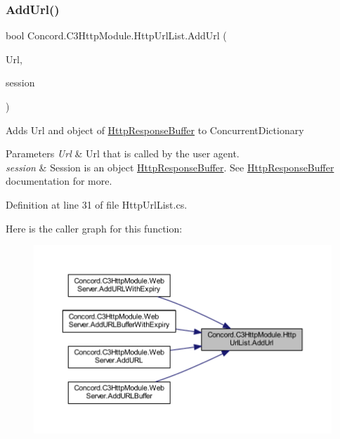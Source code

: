 \subsubsection{\texorpdfstring{AddUrl()}{AddUrl()}}
{\footnotesize\ttfamily bool Concord.\+C3\+Http\+Module.\+Http\+Url\+List.\+Add\+Url (\begin{DoxyParamCaption}\item[{string}]{Url,  }\item[{\mbox{\hyperlink{class_concord_1_1_c3_http_module_1_1_http_response_buffer}{Http\+Response\+Buffer}}}]{session }\end{DoxyParamCaption})\hspace{0.3cm}{\ttfamily [inline]}}



Adds Url and object of \mbox{\hyperlink{class_concord_1_1_c3_http_module_1_1_http_response_buffer}{Http\+Response\+Buffer}} to Concurrent\+Dictionary 


\begin{DoxyParams}{Parameters}
{\em Url} & Url that is called by the user agent.\\
\hline
{\em session} & Session is an object \mbox{\hyperlink{class_concord_1_1_c3_http_module_1_1_http_response_buffer}{Http\+Response\+Buffer}}. See \mbox{\hyperlink{class_concord_1_1_c3_http_module_1_1_http_response_buffer}{Http\+Response\+Buffer}} documentation for more.\\
\hline
\end{DoxyParams}


Definition at line 31 of file Http\+Url\+List.\+cs.

Here is the caller graph for this function\+:\nopagebreak
\begin{figure}[H]
\begin{center}
\leavevmode
\includegraphics[width=350pt]{class_concord_1_1_c3_http_module_1_1_http_url_list_acde20901c40b7add9cb2db32ab1c9953_icgraph}
\end{center}
\end{figure}
\mbox{\label{class_concord_1_1_c3_http_module_1_1_http_url_list_a561da818d67bb58784165f31e53fe2d4}} 
